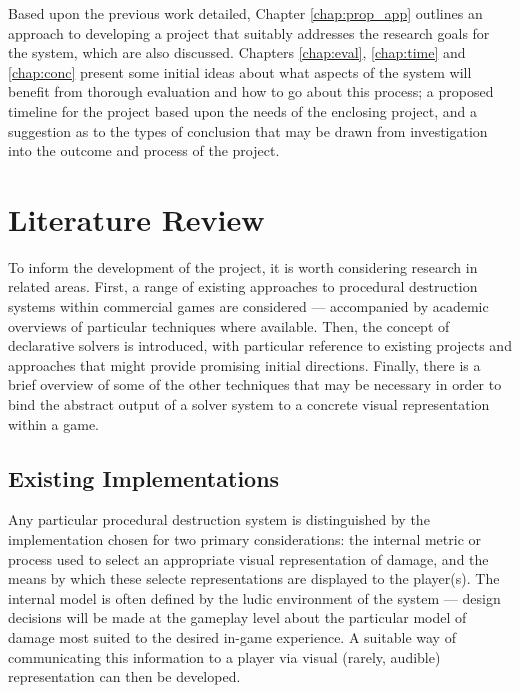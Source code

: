 \documentclass[11pt]{report}
\begin{document}
		Based upon the previous work detailed, Chapter \ref{chap:prop_app} outlines an approach to developing a project that suitably addresses the research goals for the system, which are also discussed. Chapters \ref{chap:eval}, \ref{chap:time} and \ref{chap:conc} present some initial ideas about what aspects of the system will benefit from thorough evaluation and how to go about this process; a proposed timeline for the project based upon the needs of the enclosing project, and a suggestion as to the types of conclusion that may be drawn from investigation into the outcome and process of the project.

\chapter{Literature Review}\label{chap:litrev}
	To inform the development of the project, it is worth considering research in related areas. First, a range of existing approaches to procedural destruction systems within commercial games are considered --- accompanied by academic overviews of particular techniques where available. Then, the concept of declarative solvers is introduced, with particular reference to existing projects and approaches that might provide promising initial directions. Finally, there is a brief overview of some of the other techniques that may be necessary in order to bind the abstract output of a solver system to a concrete visual representation within a game.

	\section{Existing Implementations}
		Any particular procedural destruction system is distinguished by the implementation chosen for two primary considerations: the internal metric or process used to select an appropriate visual representation of damage, and the means by which these selecte representations are displayed to the player(s). The internal model is often defined by the ludic environment of the system --- design decisions will be made at the gameplay level about the particular model of damage most suited to the desired in-game experience. A suitable way of communicating this information to a player via visual (rarely, audible) representation can then be developed.
\end{document}
